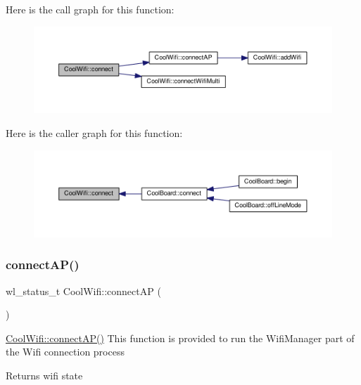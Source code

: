 Here is the call graph for this function\+:\nopagebreak
\begin{figure}[H]
\begin{center}
\leavevmode
\includegraphics[width=350pt]{classCoolWifi_ad060353050f40d032a2dbf9e54a768bf_cgraph}
\end{center}
\end{figure}
Here is the caller graph for this function\+:\nopagebreak
\begin{figure}[H]
\begin{center}
\leavevmode
\includegraphics[width=350pt]{classCoolWifi_ad060353050f40d032a2dbf9e54a768bf_icgraph}
\end{center}
\end{figure}
\mbox{\label{classCoolWifi_a7c857f27161782f5ef1d62d552aff971}} 
\subsubsection{\texorpdfstring{connect\+A\+P()}{connectAP()}}
{\footnotesize\ttfamily wl\+\_\+status\+\_\+t Cool\+Wifi\+::connect\+AP (\begin{DoxyParamCaption}{ }\end{DoxyParamCaption})}

\hyperlink{classCoolWifi_a7c857f27161782f5ef1d62d552aff971}{Cool\+Wifi\+::connect\+A\+P()} This function is provided to run the Wifi\+Manager part of the Wifi connection process

\begin{DoxyReturn}{Returns}
wifi state 
\end{DoxyReturn}


